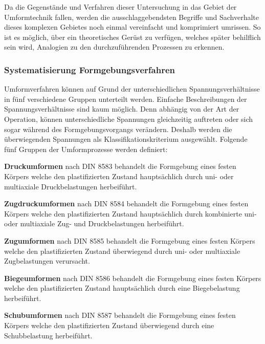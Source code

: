 \documentclass[12pt,a4paper,parskip,twoside,BCOR5mm,headsepline]{scrartcl}
\begin{document}
\begin{description*}
\begin{itemize*}
Da die Gegenstände und Verfahren dieser Untersuchung in das Gebiet der Umformtechnik fallen, werden die ausschlaggebendsten Begriffe und Sachverhalte dieses komplexen Gebietes noch einmal vereinfacht und komprimiert umrissen. So ist es möglich,  über ein theoretisches Gerüst zu verfügen,  welches später behilflich sein wird,   Analogien zu den durchzuführenden Prozessen zu erkennen.
\subsubsection{Systematisierung Formgebungsverfahren}
Umformverfahren können
auf Grund der unterschiedlichen Spannungsverhältnisse in fünf verschiedene Gruppen unterteilt werden. Einfache Beschreibungen der Spannungsverhältnisse sind kaum möglich. Denn  abhängig von der Art der Operation, können  unterschiedliche Spannungen gleichzeitig auftreten oder sich sogar  während des Formgebungsvorgangs verändern. Deshalb werden die überwiegenden Spannungen als Klassifikationskriterium ausgewählt. Folgende fünf Gruppen der Umformprozesse werden definiert:
\begin{enumerate*}
\item \textbf{Druckumformen} nach DIN 8583 behandelt die Formgebung eines festen Körpers  welche den  plastifizierten  Zustand hauptsächlich durch uni- oder multiaxiale Druckbelastungen herbeiführt.
\item \textbf{Zugdruckumformen} nach DIN 8584 behandelt die Formgebung eines festen Körpers  welche den plastifizierten Zustand  hauptsächlich durch kombinierte uni- oder multiaxiale Zug- und Druckbelastungen herbeiführt.
\item \textbf{Zugumformen} nach DIN 8585 behandelt die Formgebung eines festen Körpers welche den plastifizierten Zustand überwiegend durch uni- oder multiaxiale Zugbelastungen verursacht.
\item \textbf{Biegeumformen} nach DIN 8586 behandelt die Formgebung eines festen Körpers welche den plastifizierten Zustand hauptsächlich durch eine Biegebelastung herbeiführt.
\item \textbf{Schubumformen} nach DIN 8587 behandelt die Formgebung eines festen Körpers welche den plastifizierten Zustand überwiegend durch eine Schubbelastung herbeiführt.

\end{enumerate*}


\end{itemize*}
\end{description*}
\end{document}
